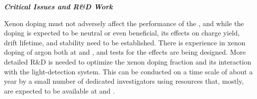 {\it\bf Critical Issues and R\&D Work}

Xenon doping must not adversely affect the performance of the , and while the doping is expected to be neutral or even beneficial, its effects on charge yield, drift lifetime, and  stability need to be established.  There is experience in xenon doping of argon both at  and , and tests for the  effects are being designed.  
More detailed R\&D is needed to optimize the xenon doping fraction and its interaction with the light-detection system. This can be conducted on a time scale of about a year by a small number of dedicated investigators using resources that, mostly, are expected to be available at  and . 

